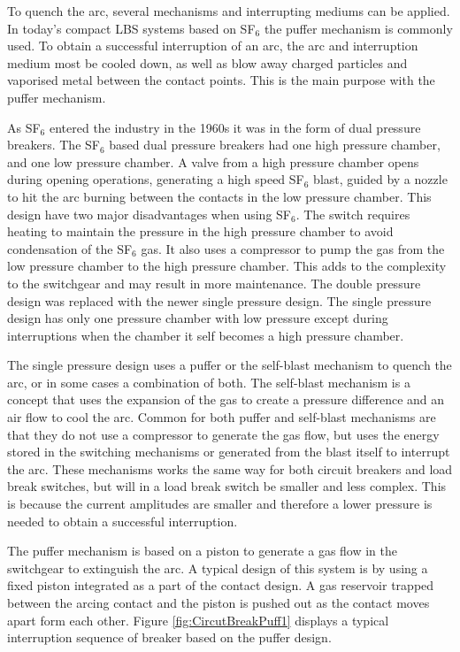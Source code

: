 \documentclass[10pt,a4paper,twoside]{article}
\begin{document}
To quench the arc, several mechanisms and interrupting mediums can be applied. In today's compact LBS systems based on SF$_6$ the puffer mechanism is commonly used. To obtain a successful interruption of an arc, the arc and interruption medium most be cooled down, as well as blow away charged particles and vaporised metal between the contact points. This is the main purpose with the puffer mechanism. 

As SF$_6$ entered the industry in the 1960s it was in the form of dual pressure breakers. The SF$_6$ based dual pressure breakers had one high pressure chamber, and one low pressure chamber. A valve from a high pressure chamber opens during opening operations, generating a high speed SF$_6$ blast, guided by a nozzle to hit the arc burning between the contacts in the low pressure chamber. This design have two major disadvantages when using SF$_6$. The switch requires heating to maintain the pressure in the high pressure chamber to avoid condensation of the SF$_6$ gas. It also uses a compressor to pump the gas from the low pressure chamber to the high pressure chamber. This adds to the complexity to the switchgear and may result in more maintenance. The double pressure design was replaced with the newer single pressure design. The single pressure design has only one pressure chamber with low pressure except during interruptions when the chamber it self becomes a high pressure chamber.

The single pressure design uses a puffer or the self-blast mechanism to quench the arc, or in some cases a combination of both. The self-blast mechanism is a concept that uses the expansion of the gas to create a pressure difference and an air flow to cool the arc. Common for both puffer and self-blast mechanisms are that they do not use a compressor to generate the gas flow, but uses the energy stored in the switching mechanisms or generated from the blast itself to interrupt the arc. These mechanisms works the same way for both circuit breakers and load break switches, but will in a load break switch be smaller and less complex. This is because the current amplitudes are smaller and therefore a lower pressure is needed to obtain a successful interruption.

The puffer mechanism is based on a piston to generate a gas flow in the switchgear to extinguish the arc. A typical design of this system is by using a fixed piston integrated as a part of the contact design. A gas reservoir trapped between the arcing contact and the piston is pushed out as the contact moves apart form each other. Figure \ref{fig:CircutBreakPuff1} displays a typical interruption sequence of breaker based on the puffer design.
\end{document}
